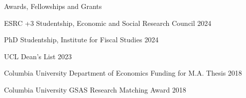 \documentclass{resume} %
\begin{document}
\newpage
\begin{rSection}{Awards, Fellowships and Grants}

ESRC +3 Studentship, Economic and Social Research Council \hfill {2024}

PhD Studentship, Institute for Fiscal Studies \hfill {2024}

UCL Dean's List \hfill {2023}

Columbia University Department of Economics Funding for M.A. Thesis \hfill {2018}

Columbia University GSAS Research Matching Award \hfill {2018}




\end{rSection}

\end{document}
